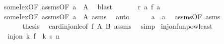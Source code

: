 \begin{isabellebody}
\ someI{\isacharunderscore}{\kern0pt}ex{\isacharbrackleft}{\kern0pt}OF\ assms{\isacharparenleft}{\kern0pt}{}{\isacharparenright}{\kern0pt}{\isacharbrackleft}{\kern0pt}OF\ {\isacartoucheopen}a{}\ {\isasymin}\ A{\isacartoucheclose}{\isacharbrackright}{\kern0pt}{\isacharbrackright}{\kern0pt}\ \isamarkupfalse%
\ blast\isanewline
\ \ \ \ \isamarkupfalse%
\ {}{\isacharcolon}{\kern0pt}\ {\isachardoublequoteopen}r\ a{}\ {\isacharparenleft}{\kern0pt}{\isacharquery}{\kern0pt}f\ a{}{\isacharparenright}{\kern0pt}{\isachardoublequoteclose}\ \isamarkupfalse%
\ someI{\isacharunderscore}{\kern0pt}ex{\isacharbrackleft}{\kern0pt}OF\ assms{\isacharparenleft}{\kern0pt}{}{\isacharparenright}{\kern0pt}{\isacharbrackleft}{\kern0pt}OF\ {\isacartoucheopen}a{}\ {\isasymin}\ A{\isacartoucheclose}{\isacharbrackright}{\kern0pt}{\isacharbrackright}{\kern0pt}\ asms{\isacharparenleft}{\kern0pt}{}{\isacharparenright}{\kern0pt}\ \isamarkupfalse%
\ auto\isanewline
\ \ \ \ \isamarkupfalse%
\ {\isachardoublequoteopen}a{}\ {\isacharequal}{\kern0pt}\ a{}{\isachardoublequoteclose}\ \isamarkupfalse%
\ assms{\isacharparenleft}{\kern0pt}{}{\isacharparenright}{\kern0pt}{\isacharbrackleft}{\kern0pt}OF\ asms{\isacharparenleft}{\kern0pt}{}{\isacharcomma}{\kern0pt}{}{\isacharparenright}{\kern0pt}\ {}\ {}\ {}{\isacharbrackright}{\kern0pt}\ \isacommand{{\isachardot}{\kern0pt}}\isamarkupfalse%
\isanewline
\ \ \isamarkupfalse%
\isanewline
\ \ \isamarkupfalse%
\ {}\ \isamarkupfalse%
\ {\isacharquery}{\kern0pt}thesis\ \isamarkupfalse%
\ card{\isacharunderscore}{\kern0pt}inj{\isacharunderscore}{\kern0pt}on{\isacharunderscore}{\kern0pt}le{\isacharbrackleft}{\kern0pt}of\ {\isacharquery}{\kern0pt}f\ A\ B{\isacharbrackright}{\kern0pt}\ assms{\isacharparenleft}{\kern0pt}{}{\isacharparenright}{\kern0pt}\ \isamarkupfalse%
\ simp\isanewline
{}\isamarkupfalse%
%
\endisatagproof
{\isafoldproof}%
%
\isadelimproof
\isanewline
%
\endisadelimproof
\isanewline
{}\isamarkupfalse%
\ inj{\isacharunderscore}{\kern0pt}on{\isacharunderscore}{\kern0pt}funpow{\isacharunderscore}{\kern0pt}least{\isacharcolon}{\kern0pt}\ \isanewline
\ \ {\isacartoucheopen}inj{\isacharunderscore}{\kern0pt}on\ {\isacharparenleft}{\kern0pt}{\isasymlambda}k{\isachardot}{\kern0pt}\ {\isacharparenleft}{\kern0pt}f\ {\isacharcircum}{\kern0pt}{\isacharcircum}{\kern0pt}\ k{\isacharparenright}{\kern0pt}\ s{\isacharparenright}{\kern0pt}\ {\isacharbraceleft}{\kern0pt}{}{\isachardot}{\kern0pt}{\isachardot}{\kern0pt}{\isacharless}{\kern0pt}n{\isacharbraceright}{\kern0pt}{\isacartoucheclose}\isanewline

\end{isabellebody}
